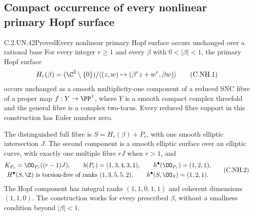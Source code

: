 \subsection{Compact occurrence of every nonlinear primary Hopf surface}

\begin{statement}{C.2.UN.42}{Proved}{Every nonlinear primary Hopf surface occurs unchanged over a rational base}
For every integer $r\ge1$ and every $\beta$ with $0<|\beta|<1$,
the primary Hopf surface
\[
 H_r(\beta)=(\C^2\setminus\{0\})/
   \langle(z,w)\mapsto(\beta^r z+w^r,\beta w)\rangle
                                                        \tag{C.NH.1}
\]
occurs unchanged as a smooth multiplicity-one component of a
reduced SNC fibre of a proper map $f:Y\to\PP^1$, where $Y$ is
a smooth compact complex threefold and the general fibre is a
complex two-torus. Every reduced fibre support in this
construction has Euler number zero.

The distinguished full fibre is $S=H_r(\beta)+P_r$, with one
smooth elliptic intersection $J$. The second component is a
smooth elliptic surface over an elliptic curve, with exactly
one multiple fibre $rJ$ when $r>1$, and
\[
 \begin{gathered}
 K_{P_r}=\OO_{P_r}((r-1)J),\qquad
 b(P_r)=(1,3,4,3,1),\qquad h^\bullet(\OO_{P_r})=(1,2,1),\\
 H^\bullet(S,\Z)\text{ is torsion-free of ranks }(1,3,5,5,2),
 \qquad h^\bullet(S,\OO_S)=(1,2,1).
 \end{gathered}                                         \tag{C.NH.2}
\]
The Hopf component has integral ranks $(1,1,0,1,1)$ and
coherent dimensions $(1,1,0)$. The construction works for
every prescribed $\beta$, without a smallness condition
beyond $|\beta|<1$.
\end{statement}

